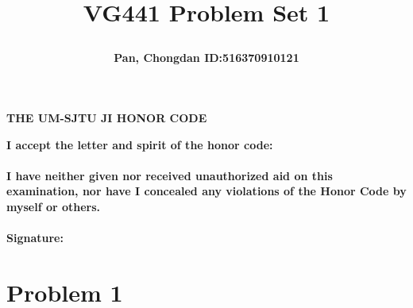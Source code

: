 \documentclass[a4paper]{article}
\title{\Large \textbf{VG441 Problem Set 1}\\
\author{\textbf{Pan, Chongdan ID:516370910121}\\
}
}
\begin{document}
\maketitle
\begin{center}
    \textbf{\Large{THE UM-SJTU JI HONOR CODE}}
\end{center}

\noindent\textbf{I accept the letter and spirit of the honor code:\\\\
I have neither given nor received unauthorized aid on this examination, nor have
I concealed any violations of the Honor Code by myself or others.\\\\Signature:}

\section{Problem 1}
\end{document}
